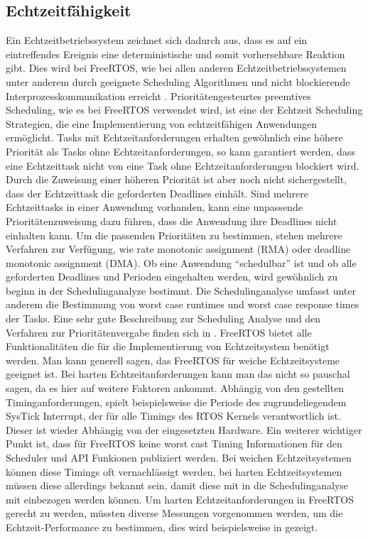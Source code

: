 \subsection{Echtzeitfähigkeit}
Ein Echtzeitbetriebssystem zeichnet sich dadurch aus, dass es auf ein eintreffendes Ereignis eine deterministische und somit vorhersehbare Reaktion gibt. Dies wird bei FreeRTOS, wie bei allen anderen Echtzeitbetriebssystemen unter anderem durch geeignete Scheduling Algorithmen und nicht blockierende Interprozesskommunikation erreicht\cite{9780128015070} \cite{Jones:1997:CRT:269005.266689} \cite{Regehr:2001:ACR:882481.883779}. Prioritätengesteurtes preemtives Scheduling, wie es bei FreeRTOS verwendet wird, ist eine der Echtzeit Scheduling Strategien\cite{9780128015070}, die eine Implementierung von echtzeitfähigen Anwendungen ermöglicht. Tasks mit Echtzeitanforderungen erhalten gewöhnlich eine höhere Priorität als Tasks ohne Echtzeitanforderungen, so kann garantiert werden, dass eine Echtzeittask nicht von eine Task ohne Echtzeitanforderungen blockiert wird. Durch die Zuweisung einer höheren Priorität ist aber noch nicht sichergestellt, dass der Echtzeittask die geforderten Deadlines einhält. Sind mehrere Echtzeittasks in einer Anwendung vorhanden, kann eine unpassende Prioritätenzuweisung  dazu führen, dass die Anwendung ihre Deadlines nicht einhalten kann\cite{9780128015070}. Um die passenden Prioritäten zu bestimmen, stehen mehrere Verfahren zur Verfügung, wie rate monotonic assignment (RMA) oder deadline monotonic assignment (DMA). Ob eine Anwendung "`schedulbar"' ist und ob alle geforderten Deadlines und Perioden eingehalten werden, wird gewöhnlich zu beginn in der Schedulinganalyze bestimmt. Die Schedulinganalyse umfasst unter anderem die Bestimmung von worst case runtimes und worst case response times der Tasks. Eine sehr gute Beschreibung zur Scheduling Analyse und den Verfahren zur Prioritätenvergabe finden sich in \cite{9780128015070}. FreeRTOS bietet alle Funktionalitäten die für die Implementierung von Echtzeitsystem benötigt werden. Man kann generell sagen, das FreeRTOS für weiche Echtzeitsysteme geeignet ist. Bei harten Echtzeitanforderungen kann man das nicht so pauschal sagen, da es hier auf weitere Faktoren ankommt. Abhängig von den gestellten Timinganforderungen, spielt beispielsweise die Periode des zugrundeliegendem SysTick Interrupt, der für alle Timings des RTOS Kernels verantwortlich ist. Dieser ist wieder Abhängig von der eingesetzten Hardware. Ein weiterer wichtiger Punkt ist, dass für FreeRTOS keine worst cast Timing Informationen für den Scheduler und API Funkionen publiziert werden. Bei weichen Echtzeitsystemen können diese Timings oft vernachlässigt werden, bei harten Echtzeitsystemen müssen diese allerdings bekannt sein, damit diese mit in die Schedulinganalyse mit einbezogen werden können. Um harten Echtzeitanforderungen in FreeRTOS gerecht zu werden, müssten diverse Messungen vorgenommen werden, um die Echtzeit-Performance zu bestimmen, dies wird beispielsweise in\cite{RealTimePerformance} gezeigt.     